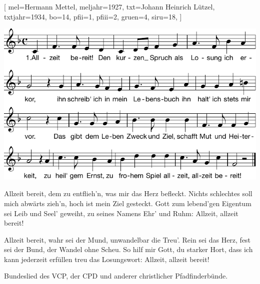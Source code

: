[
    mel={Hermann Mettel}, 
    meljahr={1927},
    txt={Johann Heinrich Lützel}, 
    txtjahr={1934},
    bo={14}, 
    pfii={1}, 
    pfiii={2}, 
    gruen={4}, 
    siru={18},
]

\beginverse 
\endverse  
\centering\includegraphics[width=1\textwidth]{Noten/Lied003.pdf}	

\beginverse
Allzeit bereit, dem zu entflieh'n, was mir das Herz befleckt.
Nichts schlechtes soll mich abwärts zieh'n, hoch ist mein Ziel gesteckt.
Gott zum lebend'gen Eigentum sei Leib und Seel' geweiht,
zu seines Namens Ehr' und Ruhm: Allzeit, allzeit bereit!
\endverse

\beginverse
Allzeit bereit, wahr sei der Mund, unwandelbar die Treu'.
Rein sei das Herz, fest sei der Bund, der Wandel ohne Scheu.
So hilf mir Gott, du starker Hort, dass ich kann jederzeit
erfüllen treu das Losungswort: Allzeit, allzeit bereit!
\endverse

\endsong

\beginscripture{}
Bundeslied des VCP, der CPD und anderer christlicher Pfadfinderbünde.
\endscripture
